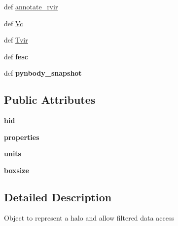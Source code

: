 \begin{DoxyCompactItemize}
\item 
def \hyperlink{classseren3_1_1halos_1_1Halo_a968e5dfbe7df6dd1b86cfc8759989429}{annotate\_\-rvir}
\item 
def \hyperlink{classseren3_1_1halos_1_1Halo_a110253908b47cf70fb156ab0eb602135}{Vc}
\item 
def \hyperlink{classseren3_1_1halos_1_1Halo_ab424a563b7ca0f0cef9dc5d54fe8c894}{Tvir}
\item 
\hypertarget{classseren3_1_1halos_1_1Halo_aa9a7d6268185dae43d6a4fd9180b45bc}{
def {\bfseries fesc}}
\label{classseren3_1_1halos_1_1Halo_aa9a7d6268185dae43d6a4fd9180b45bc}

\item 
\hypertarget{classseren3_1_1halos_1_1Halo_adef5d03c47c2c44703ef3d0edd4105dc}{
def {\bfseries pynbody\_\-snapshot}}
\label{classseren3_1_1halos_1_1Halo_adef5d03c47c2c44703ef3d0edd4105dc}

\end{DoxyCompactItemize}
\subsection*{Public Attributes}
\begin{DoxyCompactItemize}
\item 
\hypertarget{classseren3_1_1halos_1_1Halo_ae51a4579fa05e4e7cce9cfd3ce170d25}{
{\bfseries hid}}
\label{classseren3_1_1halos_1_1Halo_ae51a4579fa05e4e7cce9cfd3ce170d25}

\item 
\hypertarget{classseren3_1_1halos_1_1Halo_a5fff17dac25c682dddf28fed6c0146d9}{
{\bfseries properties}}
\label{classseren3_1_1halos_1_1Halo_a5fff17dac25c682dddf28fed6c0146d9}

\item 
\hypertarget{classseren3_1_1halos_1_1Halo_aee64cc2e45af357dad3fc8304d3f4bec}{
{\bfseries units}}
\label{classseren3_1_1halos_1_1Halo_aee64cc2e45af357dad3fc8304d3f4bec}

\item 
\hypertarget{classseren3_1_1halos_1_1Halo_a296c3ee0f82f3b1cc1201f24db9154e3}{
{\bfseries boxsize}}
\label{classseren3_1_1halos_1_1Halo_a296c3ee0f82f3b1cc1201f24db9154e3}

\end{DoxyCompactItemize}


\subsection{Detailed Description}
\begin{DoxyVerb}
Object to represent a halo and allow filtered data access
\end{DoxyVerb}
 

